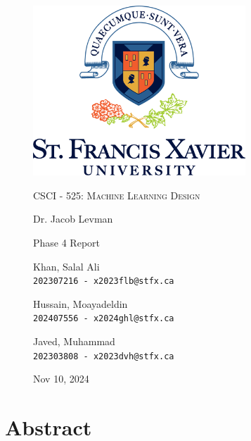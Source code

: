 \documentclass[a4paper,12pt]{article}
\begin{document}
\begin{titlepage}

\begin{figure}[H]
  \centering
  \includegraphics[width=8cm]{../stfx_logo.png}\par
  \vspace{1cm}
  {\scshape\Large CSCI - 525: Machine Learning Design \par}
  \vspace{0.5cm}
  {\large Dr. Jacob Levman \par}
  \vspace{1cm}
  {\Large Phase 4 Report \par}
  \vspace{1cm}
  {\large Khan, Salal Ali\\ \texttt{202307216 - x2023flb@stfx.ca} \par}
  \vspace{0.5cm}
  {\large Hussain, Moayadeldin\\ \texttt{202407556 - x2024ghl@stfx.ca} \par}
  \vspace{0.5cm}
  {\large Javed, Muhammad\\ \texttt{202303808 - x2023dvh@stfx.ca} \par}
  \vfill
  \vspace{0.5cm}
  {\large Nov 10, 2024 \par}
\end{figure}

\end{titlepage}

\section*{Abstract}
\end{document}
